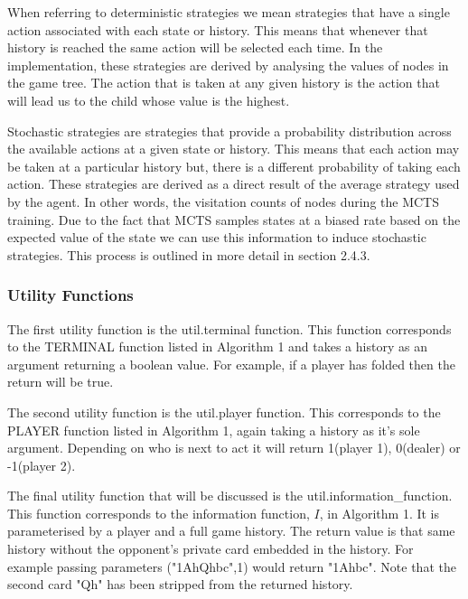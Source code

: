When referring to deterministic strategies we mean strategies that have a single
action associated with each state or history.
This means that whenever that history is reached the same action will be selected each time.
In the implementation, these strategies are derived by analysing the values of nodes in the game tree.
The action that is taken at any given history is the action that will lead us to the child whose
value is the highest.

Stochastic strategies are strategies that provide a probability distribution across the available actions
at a given state or history.
This means that each action may be taken at a particular history but, there is a different probability
of taking each action.
These strategies are derived as a direct result of the average strategy used by the agent.
In other words, the visitation counts of nodes during the MCTS training.
Due to the fact that MCTS samples states at a biased rate based on the expected value of the state we
can use this information to induce stochastic strategies.
This process is outlined in more detail in section 2.4.3.

\subsubsection{Utility Functions}\label{subsec:utility}
The first utility function is the util.terminal function.
This function corresponds to the TERMINAL function listed in Algorithm 1 and
takes a history as an argument returning a boolean value.
For example, if a player has folded then the return will be true.

The second utility function is the util.player function.
This corresponds to the PLAYER function listed in Algorithm 1, again taking a history as it's sole argument.
Depending on who is next to act it will return 1(player 1), 0(dealer) or -1(player 2).

The final utility function that will be discussed is the util.information\_function.
This function corresponds to the information function, $I$, in Algorithm 1.
It is parameterised by a player and a full game history.
The return value is that same history without the opponent's private card
embedded in the history.
For example passing parameters ("1AhQhbc",1) would return "1Ahbc".
Note that the second card "Qh" has been stripped from the returned history.

